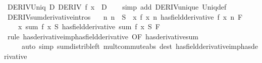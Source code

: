 \begin{isabellebody}
\ DERIV{\isacharunderscore}{\kern0pt}Uniq{\isacharcolon}{\kern0pt}\ {\isachardoublequoteopen}{\isasymexists}\isactrlsub {\isasymle}D{\isachardot}{\kern0pt}\ DERIV\ f\ x\ {\isacharcolon}{\kern0pt}{\isachargreater}{\kern0pt}\ D{\isachardoublequoteclose}\isanewline
%
\isadelimproof
\ \ %
\endisadelimproof
%
\isatagproof
{}\isamarkupfalse%
\ {\isacharparenleft}{\kern0pt}simp\ add{\isacharcolon}{\kern0pt}\ DERIV{\isacharunderscore}{\kern0pt}unique\ Uniq{\isacharunderscore}{\kern0pt}def{\isacharparenright}{\kern0pt}%
\endisatagproof
{\isafoldproof}%
%
\isadelimproof
\isanewline
%
\endisadelimproof
\isanewline
{}\isamarkupfalse%
\ DERIV{\isacharunderscore}{\kern0pt}sum{\isacharbrackleft}{\kern0pt}derivative{\isacharunderscore}{\kern0pt}intros{\isacharbrackright}{\kern0pt}{\isacharcolon}{\kern0pt}\isanewline
\ \ {\isachardoublequoteopen}{\isacharparenleft}{\kern0pt}{\isasymAnd}\ n{\isachardot}{\kern0pt}\ n\ {\isasymin}\ S\ {\isasymLongrightarrow}\ {\isacharparenleft}{\kern0pt}{\isacharparenleft}{\kern0pt}{\isasymlambda}x{\isachardot}{\kern0pt}\ f\ x\ n{\isacharparenright}{\kern0pt}\ has{\isacharunderscore}{\kern0pt}field{\isacharunderscore}{\kern0pt}derivative\ {\isacharparenleft}{\kern0pt}f{\isacharprime}{\kern0pt}\ x\ n{\isacharparenright}{\kern0pt}{\isacharparenright}{\kern0pt}\ F{\isacharparenright}{\kern0pt}\ {\isasymLongrightarrow}\isanewline
\ \ \ \ {\isacharparenleft}{\kern0pt}{\isacharparenleft}{\kern0pt}{\isasymlambda}x{\isachardot}{\kern0pt}\ sum\ {\isacharparenleft}{\kern0pt}f\ x{\isacharparenright}{\kern0pt}\ S{\isacharparenright}{\kern0pt}\ has{\isacharunderscore}{\kern0pt}field{\isacharunderscore}{\kern0pt}derivative\ sum\ {\isacharparenleft}{\kern0pt}f{\isacharprime}{\kern0pt}\ x{\isacharparenright}{\kern0pt}\ S{\isacharparenright}{\kern0pt}\ F{\isachardoublequoteclose}\isanewline
%
\isadelimproof
\ \ %
\endisadelimproof
%
\isatagproof
{}\isamarkupfalse%
\ {\isacharparenleft}{\kern0pt}rule\ has{\isacharunderscore}{\kern0pt}derivative{\isacharunderscore}{\kern0pt}imp{\isacharunderscore}{\kern0pt}has{\isacharunderscore}{\kern0pt}field{\isacharunderscore}{\kern0pt}derivative\ {\isacharbrackleft}{\kern0pt}OF\ has{\isacharunderscore}{\kern0pt}derivative{\isacharunderscore}{\kern0pt}sum{\isacharbrackright}{\kern0pt}{\isacharparenright}{\kern0pt}\isanewline
\ \ \ \ \ {\isacharparenleft}{\kern0pt}auto\ simp{\isacharcolon}{\kern0pt}\ sum{\isacharunderscore}{\kern0pt}distrib{\isacharunderscore}{\kern0pt}left\ mult{\isacharunderscore}{\kern0pt}commute{\isacharunderscore}{\kern0pt}abs\ dest{\isacharcolon}{\kern0pt}\ has{\isacharunderscore}{\kern0pt}field{\isacharunderscore}{\kern0pt}derivative{\isacharunderscore}{\kern0pt}imp{\isacharunderscore}{\kern0pt}has{\isacharunderscore}{\kern0pt}derivative{\isacharparenright}{\kern0pt}%

\end{isabellebody}
